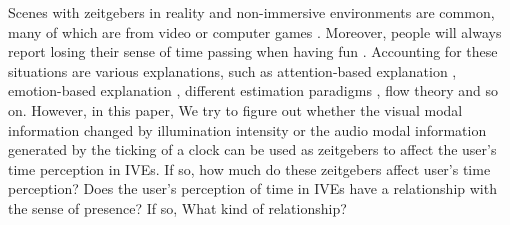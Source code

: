 \documentclass[sigconf]{acmart}
\begin{document}

Scenes with zeitgebers in reality and non-immersive environments are common, many of which are from video or computer games \cite{bruder2014threefolded,tobin2009video}. Moreover, people will always report losing their sense of time passing when having fun \cite{sanders2010time}. Accounting for these situations are various explanations, such as attention-based explanation \cite{block2010cognitive,张义芳2011时间知觉的影响因素研究综述}, emotion-based explanation \cite{angrilli1997influence,droit2007emotions}, different estimation paradigms \cite{block1997prospective,赵雪2012时距知觉研究综述}, flow theory \cite{nakamura2014concept,csikszentmihalyi1997finding} and so on. However, in this paper, We try to figure out whether the visual modal information changed by illumination intensity or the audio modal information generated by the ticking of a clock can be used as zeitgebers to affect the user's time perception in IVEs. If so, how much do these zeitgebers affect user's time perception? Does the user's perception of time in IVEs have a relationship with the sense of presence? If so, What kind of relationship?

\end{document}
